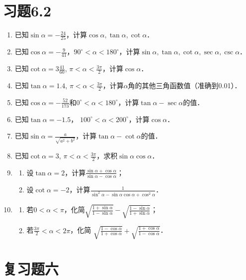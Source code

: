 \section*{习题6.2}
\begin{enumerate}
    \item 已知$\sin\alpha=-\frac{24}{25}$，计算$\cos\alpha, \tan\alpha, \cot\alpha$．
    \item 已知$\cos\alpha=-\frac{9}{41}$，$90^{\circ}<\alpha<180^{\circ}$，计算$\sin\alpha, \tan\alpha, \cot\alpha,\sec\alpha, \csc\alpha$．
\item 已知$\cot\alpha=3\frac{41}{60}$, $\pi<\alpha<\frac{3\pi}{2}$，计算$\cos\alpha$．
\item 已知$\tan\alpha=1.4$, $\pi<\alpha<\frac{3\pi}{2}$，计算$\alpha$角的其他三角函数值（准确到0.01）．
\item 已知$\cos\alpha=-\frac{52}{173}$和$0^{\circ}<\alpha<180^{\circ}$，计算$\tan\alpha-\sec\alpha$的值．
\item 已知$\tan\alpha=-1.5$， $100^{\circ}<\alpha<200^{\circ}$，计算$\cos\alpha$．
\item 已知$\sin\alpha=\frac{a}{\sqrt{a^2+b^2}}$，计算$\tan\alpha-\cot\alpha$的值．
\item 已知$\cot\alpha=3$, $\pi<\alpha<\frac{3\pi}{2}$，求积$\sin\alpha\cos\alpha$．
\item \begin{enumerate}
    \item 设$\tan\alpha=2$，计算$\frac{\sin\alpha+\cos\alpha}{\sin\alpha-\cos\alpha}$；
    \item 设$\cot\alpha=-2$，计算$\frac{1}{\sin^2\alpha-\sin\alpha\cos\alpha+\cos^2\alpha}$．
\end{enumerate}
\item \begin{enumerate}
    \item 若$0<\alpha<\pi$，化简$\sqrt{\frac{1+\sin\alpha}{1-\sin\alpha}}-\sqrt{\frac{1-\sin\alpha}{1+\sin\alpha}}$；
    \item 若$\frac{3\pi}{2}<\alpha<2\pi$，化简
    $\sqrt{\frac{1-\cos\alpha}{1+\cos\alpha}}+\sqrt{\frac{1+\cos\alpha}{1-\cos\alpha}}$．
\end{enumerate}
\end{enumerate}

\section*{复习题六}

